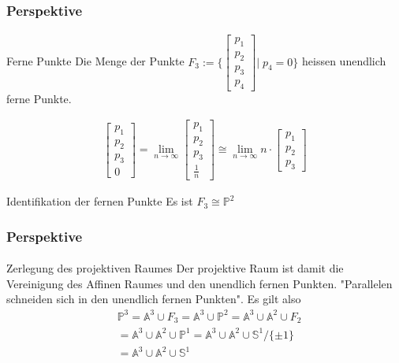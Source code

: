 \documentclass{beamer}
\begin{document}
\begin{frame}
    \frametitle{Perspektive}
\framesubtitle{}
\begin{block}{Ferne Punkte}
Die Menge der Punkte $F_3 := \Biggl \{\begin{bmatrix} p_1 \\ p_2 \\ p_3  \\ p_4 \end{bmatrix}\Bigg | \; p_{4} = 0 \Biggr \} $ heissen unendlich ferne Punkte.

\begin{align*}
 \begin{bmatrix} p_1 \\ p_2 \\ p_3  \\ 0 \end{bmatrix}  =\lim_{n \to \infty} \begin{bmatrix} p_1 \\ p_2 \\ p_3  \\ \frac{1}{n} \end{bmatrix}  \cong  \lim_{n \to \infty} n \cdot  \begin{bmatrix} p_1 \\ p_2 \\ p_3 \end{bmatrix} 
\end{align*}
\end{block}

\begin{block}{Identifikation der fernen Punkte}
Es ist $F_3 \cong \mathbb{P}^2$
\end{block}
\end{frame}


\begin{frame}
    \frametitle{Perspektive}
\framesubtitle{}
\begin{block}{Zerlegung des projektiven Raumes}
Der projektive Raum ist damit die Vereinigung des Affinen Raumes und den unendlich fernen Punkten. "Parallelen schneiden sich in den unendlich fernen Punkten".
Es gilt also 
\begin{align*}
& \mathbb{P}^3 = \mathbb{A}^3 \cup F_3 = \mathbb{A}^3  \cup \mathbb{P}^2 =  \mathbb{A}^3  \cup \mathbb{A}^2 \cup F_2  \\  
& =\mathbb{A}^3  \cup \mathbb{A}^2 \cup  \mathbb{P}^1 =   \mathbb{A}^3  \cup \mathbb{A}^2 \cup  \mathbb{S}^1/ \{ \pm  1\} \\
& =  \mathbb{A}^3  \cup \mathbb{A}^2 \cup  \mathbb{S}^1
\end{align*}
\end{block}
\end{frame}
\end{document}
